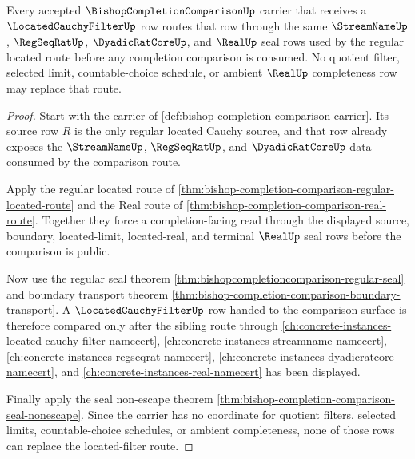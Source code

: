 \begin{theorem}
\label{thm:bishop-completion-comparison-located-filter-comparison}
Every accepted $\BishopCompletionComparisonUp$ carrier that receives a $\LocatedCauchyFilterUp$ row routes that row through the same $\StreamNameUp$, $\RegSeqRatUp$, $\DyadicRatCoreUp$, and $\RealUp$ seal rows used by the regular located route before any completion comparison is consumed. No quotient filter, selected limit, countable-choice schedule, or ambient $\RealUp$ completeness row may replace that route.
\end{theorem}
\begin{proof}
Start with the carrier of \autoref{def:bishop-completion-comparison-carrier}. Its source row $R$ is the only regular located Cauchy source, and that row already exposes the $\StreamNameUp$, $\RegSeqRatUp$, and $\DyadicRatCoreUp$ data consumed by the comparison route.

Apply the regular located route of \autoref{thm:bishop-completion-comparison-regular-located-route} and the Real route of \autoref{thm:bishop-completion-comparison-real-route}. Together they force a completion-facing read through the displayed source, boundary, located-limit, located-real, and terminal $\RealUp$ seal rows before the comparison is public.

Now use the regular seal theorem \autoref{thm:bishopcompletioncomparison-regular-seal} and boundary transport theorem \autoref{thm:bishop-completion-comparison-boundary-transport}. A $\LocatedCauchyFilterUp$ row handed to the comparison surface is therefore compared only after the sibling route through \autoref{ch:concrete-instances-located-cauchy-filter-namecert}, \autoref{ch:concrete-instances-streamname-namecert}, \autoref{ch:concrete-instances-regseqrat-namecert}, \autoref{ch:concrete-instances-dyadicratcore-namecert}, and \autoref{ch:concrete-instances-real-namecert} has been displayed.

Finally apply the seal non-escape theorem \autoref{thm:bishop-completion-comparison-seal-nonescape}. Since the carrier has no coordinate for quotient filters, selected limits, countable-choice schedules, or ambient completeness, none of those rows can replace the located-filter route.
\end{proof}

